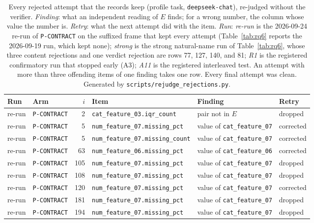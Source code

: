 \documentclass[10pt,twocolumn]{article}
\begin{document}
\begin{table}[!tp]
\caption{Every rejected attempt that the records keep (profile task,
\texttt{deepseek-chat}), re-judged without the verifier. \emph{Finding}: what
an independent reading of $E$ finds; for a wrong number, the column whose
value the number is. \emph{Retry}: what the next attempt did with the item.
\emph{Run}: \emph{re-run} is the 2026-09-24 re-run of \texttt{P-CONTRACT}
on the suffixed frame that kept every attempt (Table~\ref{tab:rq6} reports the
2026-09-19 run, which kept none); \emph{strong} is the strong natural-name run
of Table~\ref{tab:rq6}, whose three content rejections and one verdict
rejection are rows 77, 127, 140, and 81; \emph{R1} is the registered
confirmatory run that stopped early (A3); \emph{A11} is the registered
interleaved test. An attempt
with more than three offending items of one finding takes one row. Every final
attempt was clean. Generated by \texttt{scripts/rejudge\_rejections.py}.}
\label{tab:rejections}
\centering
\footnotesize
\setlength{\tabcolsep}{2.5pt}
\begin{tabular}{@{}llrlll@{}}
\toprule
Run & Arm & $i$ & Item & Finding & Retry \\
\midrule
re-run & \texttt{P-CONTRACT} & 2 & \texttt{cat\_feature\_03.iqr\_count} & pair not in $E$ & dropped \\
re-run & \texttt{P-CONTRACT} & 5 & \texttt{num\_feature\_07.missing\_pct} & value of \texttt{cat\_feature\_07} & corrected \\
re-run & \texttt{P-CONTRACT} & 5 & \texttt{num\_feature\_07.missing\_count} & value of \texttt{cat\_feature\_07} & corrected \\
re-run & \texttt{P-CONTRACT} & 63 & \texttt{num\_feature\_06.missing\_pct} & value of \texttt{cat\_feature\_06} & corrected \\
re-run & \texttt{P-CONTRACT} & 105 & \texttt{num\_feature\_07.missing\_pct} & value of \texttt{cat\_feature\_07} & dropped \\
re-run & \texttt{P-CONTRACT} & 108 & \texttt{num\_feature\_07.missing\_pct} & value of \texttt{cat\_feature\_07} & dropped \\
re-run & \texttt{P-CONTRACT} & 120 & \texttt{num\_feature\_07.missing\_pct} & value of \texttt{cat\_feature\_07} & corrected \\
re-run & \texttt{P-CONTRACT} & 181 & \texttt{num\_feature\_07.missing\_pct} & value of \texttt{cat\_feature\_07} & dropped \\
re-run & \texttt{P-CONTRACT} & 194 & \texttt{num\_feature\_07.missing\_pct} & value of \texttt{cat\_feature\_07} & dropped \\

\end{tabular}
\end{table}
\end{document}
